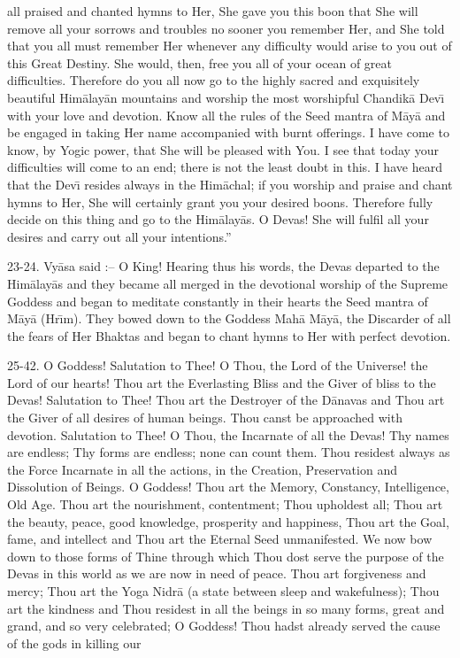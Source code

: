 all praised and chanted hymns to Her, She gave you this boon that She will remove all your sorrows and troubles no sooner you remember Her, and She told that you all must remember Her whenever any difficulty would arise to you out of this Great Destiny. She would, then, free you all of your ocean of great difficulties. Therefore do you all now go to the highly sacred and exquisitely beautiful Him\=alay\=an mountains and worship the most worshipful Chandik\=a Dev\={\i} with your love and devotion. Know all the rules of the Seed mantra of M\=ay\=a and be engaged in taking Her name accompanied with burnt offerings. I have come to know, by Yogic power, that She will be pleased with You. I see that today your difficulties will come to an end; there is not the least doubt in this. I have heard that the Dev\={\i} resides always in the Him\=achal; if you worship and praise and chant hymns to Her, She will certainly grant you your desired boons. Therefore fully decide on this thing and go to the Him\=alay\=as. O Devas! She will fulfil all your desires and carry out all your intentions.''

23-24. Vy\=asa said :-- O King! Hearing thus his words, the Devas departed to the Him\=alay\=as and they became all merged in the devotional worship of the Supreme Goddess and began to meditate constantly in their hearts the Seed mantra of M\=ay\=a (Hr\={\i}m). They bowed down to the Goddess Mah\=a M\=ay\=a, the Discarder of all the fears of Her Bhaktas and began to chant hymns to Her with perfect devotion.

25-42. O Goddess! Salutation to Thee! O Thou, the Lord of the Universe! the Lord of our hearts! Thou art the Everlasting Bliss and the Giver of bliss to the Devas! Salutation to Thee! Thou art the Destroyer of the D\=anavas and Thou art the Giver of all desires of human beings. Thou canst be approached with devotion. Salutation to Thee! O Thou, the Incarnate of all the Devas! Thy names are endless; Thy forms are endless; none can count them. Thou residest always as the Force Incarnate in all the actions, in the Creation, Preservation and Dissolution of Beings. O Goddess! Thou art the Memory, Constancy, Intelligence, Old Age. Thou art the nourishment, contentment; Thou upholdest all; Thou art the beauty, peace, good knowledge, prosperity and happiness, Thou art the Goal, fame, and intellect and Thou art the Eternal Seed unmanifested. We now bow down to those forms of Thine through which Thou dost serve the purpose of the Devas in this world as we are now in need of peace. Thou art forgiveness and mercy; Thou art the Yoga Nidr\=a (a state between sleep and wakefulness); Thou art the kindness and Thou residest in all the beings in so many forms, great and grand, and so very celebrated; O Goddess! Thou hadst already served the cause of the gods in killing our


